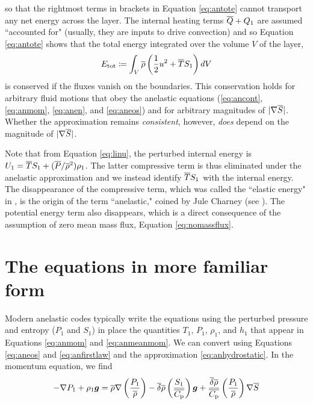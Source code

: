 \documentclass[12pt]{article}
\newcommand{\deltaref}{\overline{\delta}}
\newcommand{\cpref}{\overline{\cpcap}}
\begin{document}
so that the rightmost terms in brackets in Equation \eqref{eq:antote} cannot transport any net energy across the layer. The internal heating terms $\overline{Q} + Q_1$ are assumed ``accounted for" (usually, they are inputs to drive convection) and so Equation \eqref{eq:antote} shows that the total energy integrated over the volume $V$ of the layer,
\begin{align}
	E_{\rm tot} \coloneqq \int_V \overline{\rho}\left(\frac{1}{2} u^2 + \overline{T} S_1\right) dV
\end{align}
is conserved if the fluxes vanish on the boundaries. This conservation holds for arbitrary fluid motions that obey the anelastic equations (\eqref{eq:ancont}, \eqref{eq:anmom}, \eqref{eq:anen}, and \eqref{eq:aneos}) and for arbitrary magnitudes of $|\nabla \overline{S}|$. Whether the approximation remains \textit{consistent}, however, \textit{does} depend on the magnitude of $|\nabla\overline{S}|$.

Note that from Equation \eqref{eq:linu}, the perturbed internal energy is $U_1 = \overline{T} S_1 + (\overline{P}/\overline{\rho}^2)\rho_1$. The latter compressive term is thus eliminated under the anelastic approximation and we instead identify $\overline{T} S_1$ with the internal energy. The disappearance of the compressive term, which was called the ``elastic energy" in \citet{Eckart1956}, is the origin of the term ``anelastic," coined by Jule Charney (see \citealt{Ogura1962}). The potential energy term also disappears, which is a direct consequence of the assumption of zero mean mass flux, Equation \eqref{eq:nomassflux}. 

\section{The \citet{Gough1969} equations in more familiar form}
Modern anelastic codes typically write the equations using the perturbed pressure and entropy ($P_1$ and $S_1$) in place the quantities $T_1$, $P_1$, $\rho_1$, and $h_1$ that appear in Equations \eqref{eq:anmom} and \eqref{eq:anmeanmom}. We can convert using Equations \eqref{eq:aneos} and \eqref{eq:anfirstlaw} and the approximation \eqref{eq:anhydrostatic}. In the momentum equation, we find
\begin{align}
	-\nabla P_1 + \rho_1\vecg = \rhoref\nabla\left(\frac{P_1}{\rhoref}\right) - \deltaref \rhoref \left(\frac{S_1}{\cpref}\right) \vecg + \frac{\deltaref\rhoref}{\cpref} \left(\frac{P_1}{\rhoref}\right)\nabla\sref
\end{align}
	\newpage
		
\end{document}
